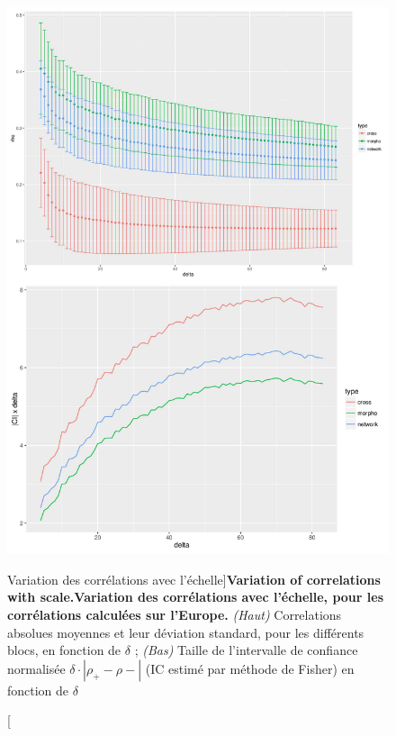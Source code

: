 \begin{figure}
\includegraphics[width=\linewidth,height=0.85\textheight]{Figures/Final/4-1-3-fig-staticcorrs-corrsdistrib}
\caption[Variation of correlations with scale][Variation des corrélations avec l'échelle]{\textbf{Variation of correlations with scale.}\label{fig:staticcorrs:corrsdistrib}}{\textbf{Variation des corrélations avec l'échelle, pour les corrélations calculées sur l'Europe.} \textit{(Haut)} Correlations absolues moyennes et leur déviation standard, pour les différents blocs, en fonction de $\delta$ ; \textit{(Bas)} Taille de l'intervalle de confiance normalisée $\delta\cdot \left|\rho_+ - \rho -\right|$ (IC estimé par méthode de Fisher) en fonction de $\delta$ \label{fig:staticcorrs:corrsdistrib}}
\end{figure}



